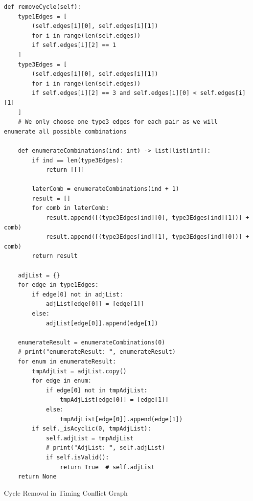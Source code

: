 \documentclass{article}
\begin{document}
\begin{listing}[H]
    \begin{verbatim}
def removeCycle(self):
    type1Edges = [
        (self.edges[i][0], self.edges[i][1])
        for i in range(len(self.edges))
        if self.edges[i][2] == 1
    ]
    type3Edges = [
        (self.edges[i][0], self.edges[i][1])
        for i in range(len(self.edges))
        if self.edges[i][2] == 3 and self.edges[i][0] < self.edges[i][1]
    ]
    # We only choose one type3 edges for each pair as we will enumerate all possible combinations

    def enumerateCombinations(ind: int) -> list[list[int]]:
        if ind == len(type3Edges):
            return [[]]

        laterComb = enumerateCombinations(ind + 1)
        result = []
        for comb in laterComb:
            result.append([(type3Edges[ind][0], type3Edges[ind][1])] + comb)
            result.append([(type3Edges[ind][1], type3Edges[ind][0])] + comb)
        return result

    adjList = {}
    for edge in type1Edges:
        if edge[0] not in adjList:
            adjList[edge[0]] = [edge[1]]
        else:
            adjList[edge[0]].append(edge[1])

    enumerateResult = enumerateCombinations(0)
    # print("enumerateResult: ", enumerateResult)
    for enum in enumerateResult:
        tmpAdjList = adjList.copy()
        for edge in enum:
            if edge[0] not in tmpAdjList:
                tmpAdjList[edge[0]] = [edge[1]]
            else:
                tmpAdjList[edge[0]].append(edge[1])
        if self._isAcyclic(0, tmpAdjList):
            self.adjList = tmpAdjList
            # print("AdjList: ", self.adjList)
            if self.isValid():
                return True  # self.adjList
    return None
    \end{verbatim}
    \caption{Cycle Removal in Timing Conflict Graph}
    \label{lst:cycle-removal}
\end{listing}
\end{document}

